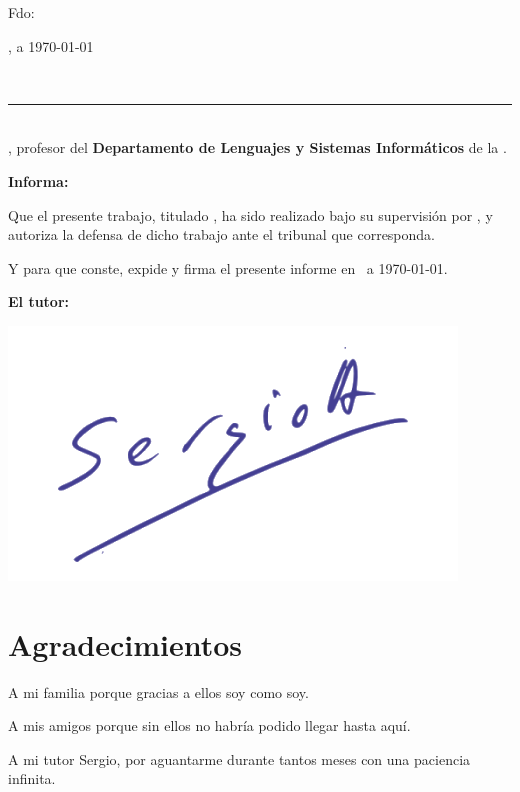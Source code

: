\noindent Fdo: \autor


\vspace{2cm}

\begin{flushright}
\ciudad, a \today
\end{flushright}

\newpage
\thispagestyle{empty}
\
\vspace{3cm}

\noindent\rule[-1ex]{\textwidth}{2pt}\\[4.5ex]

\textbf{\tutor}, profesor del \textbf{Departamento de Lenguajes y Sistemas Informáticos} de la \textbf{\universidad}.

\vspace{0.5cm}

\vspace{0.5cm}

\textbf{Informa:}

\vspace{0.5cm}

Que el presente trabajo, titulado \textit{\textbf{\titulo}}, ha sido realizado bajo su supervisión por \textbf{\autor}, y 
autoriza la defensa de dicho trabajo ante el tribunal que corresponda.

\vspace{0.5cm}

Y para que conste, expide y firma el presente informe en \ciudad\ a \today.

\vspace{1cm}

\textbf{El tutor:}

\vspace{0.5cm}
\includegraphics[scale=0.3]{../images/firmaZerjillo3.png}
\vspace{3cm}

\noindent \textbf{\tutor}

\chapter*{Agradecimientos}
\thispagestyle{empty}

\vspace{1cm}

A mi familia porque gracias a ellos soy como soy.

\bigskip
A mis amigos porque sin ellos no habría podido llegar hasta aquí.

\bigskip
A mi tutor Sergio, por aguantarme durante tantos meses con una paciencia infinita.

